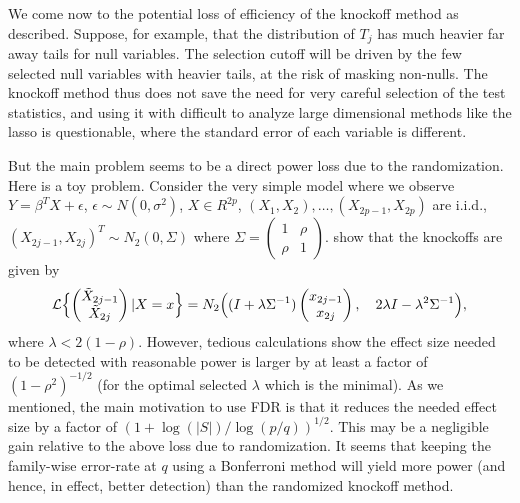 \documentclass[article,lineno]{biometrika}
\begin{document}
	We come now to the potential loss of efficiency of the knockoff method as described.
	Suppose, for example, that the distribution of $T_j$ has much heavier far away tails for null variables.
	The selection cutoff will be driven by the few selected null variables with heavier tails, at the risk of masking non-nulls.
	The knockoff method thus does not save the need for very careful selection of the test statistics, and using it with difficult to analyze large dimensional methods like the lasso is questionable, where the standard error of each variable is different.
	
	
	But the main problem seems to be  a direct power loss due to the randomization.
	Here is a toy problem.
	Consider the very simple model where we observe $Y=\beta^T X+\epsilon$, $\epsilon\sim N(0,\sigma^2)$, $X\in R^{2p}$, $(X_1,X_2),\dots,(X_{2p-1},X_{2p})$ are i.i.d.,   $(X_{2j-1},X_{2j})^T\sim N_2(0,\Sigma)$ where $\Sigma=\begin{pmatrix}1 & \rho\\\rho &1\end{pmatrix}$.
	\citet{CandesPanninggoldmodelX2018} show that the knockoffs are given by
	\begin{equation*}
		\begin{split}
			{\mathcal L}\Bigl\{\begin{pmatrix}\tilde X_{2j-1}\\\tilde X_{2j}\end{pmatrix}|X=x\Bigr\} = N_2\Bigl((I+\lambda \Sigma^{-1})\begin{pmatrix}x_{2j-1}\\x_{2j}\end{pmatrix},\hspace{1em} 2\lambda I-\lambda^2\Sigma^{-1}\Bigr),
		\end{split}
	\end{equation*}
	where $\lambda<2(1-\rho)$.
	However, tedious calculations show the effect size needed to be detected with reasonable power is larger by at least a factor of $(1-\rho^2)^{-1/2}$ (for the optimal selected $\lambda$ which is the minimal). As we mentioned, the main motivation to use FDR is that it reduces the needed effect size by a factor of $(1+\log(|S|)/\log(p/q))^{1/2}$.
	This may be a negligible gain relative to the above loss due to randomization.
	It seems that keeping the family-wise error-rate at $q$ using a Bonferroni method will yield more power (and hence, in effect, better detection) than the randomized knockoff method.
	
	
	
\end{document}
